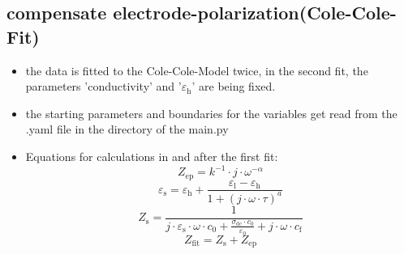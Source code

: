 \documentclass[10pt,a4paper]{article}
\renewcommand{\*}{\cdot}
\begin{document}
\subsection{compensate electrode-polarization(Cole-Cole-Fit)}
\begin{itemize}
\item the data is fitted to the Cole-Cole-Model twice, in the second fit, the parameters 'conductivity' and '$\varepsilon_\mathrm{h}$' are being fixed. 
\item the starting parameters and boundaries for the variables get read from the .yaml file in the directory of the main.py
\item Equations for calculations in and after the first fit: 
\begin{equation}
Z_\mathrm{ep} = k^{-1} \* j\*\omega^{-\alpha}
\end{equation}
\begin{equation}
\varepsilon_\mathrm{s} = \varepsilon_\mathrm{h} + \frac{\varepsilon_\mathrm{l}-\varepsilon_\mathrm{h}}{1+(j\*\omega\*\tau)^a}
\end{equation}
\begin{equation}
Z_\mathrm{s} = \frac{1}{j\*\varepsilon_\mathrm{s}\*\omega\*c_\mathrm{0} + \frac{\sigma_\mathrm{dc}\*c_\mathrm{0}}{\varepsilon_\mathrm{0}} + j\*\omega\*c_\mathrm{f}}
\end{equation}
\begin{equation}
Z_\mathrm{fit} = Z_\mathrm{s} + Z_\mathrm{ep}
\end{equation}
\end{itemize}
\end{document}
